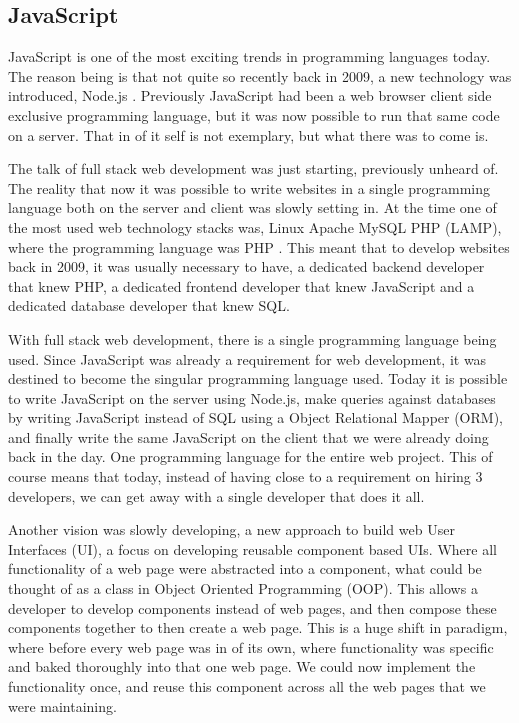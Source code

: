 \documentclass[a4paper,12pt,twoside,openright,titlepage]{book}
\begin{document}
\subsection{JavaScript}
JavaScript is one of the most exciting trends in programming languages today.
The reason being is that not quite so recently back in 2009, a new technology was introduced, Node.js \cite{nodejs_release}.
Previously JavaScript had been a web browser client side exclusive programming language, but it was now possible to run that same code on a server. That in of it self is not exemplary, but what there was to come is.

The talk of full stack web development was just starting, previously unheard of. The reality that now it was possible to write websites in a single programming language both on the server and client was slowly setting in. At the time one of the most used web technology stacks was, Linux Apache MySQL PHP (LAMP), where the programming language was PHP \cite{2009_programming}. This meant that to develop websites back in 2009, it was usually necessary to have, a dedicated backend developer that knew PHP, a dedicated frontend developer that knew JavaScript and a dedicated database developer that knew SQL.

With full stack web development, there is a single programming language being used. Since JavaScript was already a requirement for web development, it was destined to become the singular programming language used. Today it is possible to write JavaScript on the server using Node.js, make queries against databases by writing JavaScript instead of SQL using a Object Relational Mapper (ORM), and finally write the same JavaScript on the client that we were already doing back in the day. One programming language for the entire web project. This of course means that today, instead of having close to a requirement on hiring 3 developers, we can get away with a single developer that does it all.

Another vision was slowly developing, a new approach to build web User Interfaces (UI), a focus on developing reusable component based UIs.
Where all functionality of a web page were abstracted into a component, what could be thought of as a class in Object Oriented Programming (OOP).
This allows a developer to develop components instead of web pages, and then compose these components together to then create a web page.
This is a huge shift in paradigm, where before every web page was in of its own, where functionality was specific and baked thoroughly into that one web page. We could now implement the functionality once, and reuse this component across all the web pages that we were maintaining.
\end{document}
